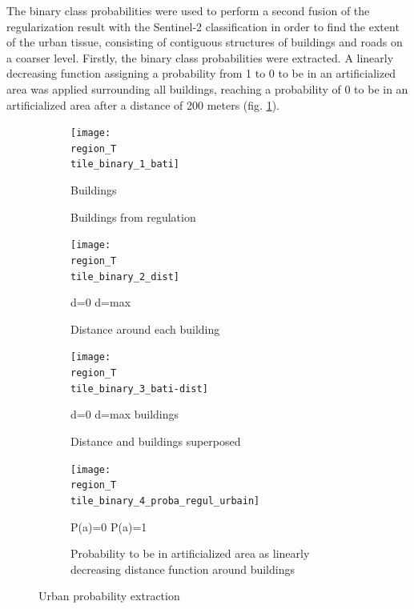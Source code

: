 \documentclass[10pt]{article}
\newcommand{\tile}{41000_30000}
\newcommand{\region}{finistere}
\begin{document}
The binary class probabilities were used to perform a second fusion of the regularization result with the Sentinel-2 classification in order to find the extent of the urban tissue, consisting of contiguous structures of buildings and roads on a coarser level. Firstly, the binary class probabilities were extracted. A linearly decreasing function assigning a probability from 1 to 0 to be in an artificialized area was applied surrounding all buildings, reaching a probability of 0 to be in an artificialized area after a distance of 200 meters (fig. \ref{fig:regul_fusion_steps}).

\begin{figure}[H]
    \centering
    \begin{subfigure}{0.49\textwidth}
        \centering
        \texttt{[image: \\region\_T\\tile\_binary\_1\_bati]}
        \caption{Buildings from regulation}
        {\vspace{3mm}
            \small\centering
            \quad Buildings
        }
    \end{subfigure}
    \begin{subfigure}{0.49\textwidth}
        \centering
        \texttt{[image: \\region\_T\\tile\_binary\_2\_dist]}
        \caption{Distance around each building}
        {\vspace{3mm}
            \small\centering
            \quad d=0 
            \quad d=max
        }
    \end{subfigure}
    \begin{subfigure}{0.49\textwidth}
        \centering
        \texttt{[image: \\region\_T\\tile\_binary\_3\_bati-dist]}
        \caption{Distance and buildings superposed}
        {\vspace{3mm}
            \small\centering
            \quad d=0 
            \quad d=max
             \quad buildings
        }
    \end{subfigure}
    \begin{subfigure}{0.49\textwidth}
        \centering
        \texttt{[image: \\region\_T\\tile\_binary\_4\_proba\_regul\_urbain]}
        \caption{Probability to be in artificialized area as linearly decreasing distance function around buildings}
        {\vspace{3mm}
            \small\centering
            \quad P(a)=0 
            \quad P(a)=1
        }
    \end{subfigure}
    \caption{Urban probability extraction}
    \label{fig:regul_fusion_steps}
\end{figure}
\end{document}
